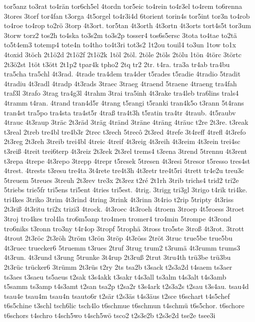{tor5anz
to3rat
to4rän
tor6ch5el
4tordn
tor5eic
to4rein
to4r3el
to4rem
to6renna
3tores
3torf
tor4fan
t3orga
4t5orgel
to4r3i4d
6torient
torin4s
tor5int
tor3n
to4rob
to4roe
to4rop
to2rö
3torp
4t3ort.
tor5tan
4t3orth
4t3ortn
4t3orts
tort4s5t
tor3um
3torw
torz2
tos2h
to4ska
to3s2m
to3s2p
tosser4
tos6s5ersc
3tota
to4tae
to2tä
to5t4em3
totemp4
tote4n
to4tho
to4t3ri
tot3s2
1t2ou
touil4
to3un
1tow
to1x
4toxid
3töch
2t1ö2d
2t1ö2f
2t1ö2k
1töl
2töl.
2töle
2töls
2tölu
1tön
4törc
3törtc
2t3ö2st
1töt
t3ött
2t1p2
tpar4k
tpho2
2tq
tr2
2tr.
t4ra.
tra3a
tr4ab
tra4bu
tra5cha
tra5chl
4t3rad.
4trade
tra4dem
tra4der
t5rades
t5radie
4tradio
5tradit
4tradiu
4t3radl
4tradp
4t3rads
3traec
3traeg
4traend
5traene
4traeng
tra4fah
traf3l
3trafo
3trag
tra4g3l
4trahm
3trai
tra5inh
4t3rake
tra4leb
tra6lins
trals4
4tramm
t4ran.
4trand
tran4d5r
4trang
t5rangi
t5ranki
tran4k5o
t3rann
5t4rans
tran4st
tra5po
tra4sta
tra4st5r
4traß
tra4t3h
t5ratin
tra4tr
4traub.
4t5raubv
4trauc
4t3raup
3träc
2t3räd
3träg
4tränd
3träne
4träng
4träuc
t2re
2t3re.
t3reak
t3real
2treb
tre4bl
tre4b3r
2trec
t3rech
5trecô
2t3red
4trefe
3t4reff
4trefl
4t3refo
2t3reg
2t3reh
3treib
trei4bl
4treic
4treif
4t3reig
4t3reih
4t3reim
4t3rein
trei4sc
t3reiß
4treit
trei6terp
4t3reiz
2t3rek
2t3rel
trems4
t3rena
3trend
5trennu
4t3rent
t3repa
4trepe
4t3repo
3trepp
4trepr
t5resek
5tresen
4t3resi
5tresor
t5resso
tres4st
4trest.
4trests
t3resu
tre4ta
3t4rete
tre4t3h
4t3retr
tre4t5ri
4trett
tr4e2u
treu3c
5treuem
5treues
3treuh
2t3rev
tre3x
2t3rez
t2ré
2t1rh
3trib
trichs4
trid2
tri2e
5triebs
trie5fr
tri5ens
tri5ent
4tries
tri5est.
4trig.
3trigg
tri3gl
3trigo
t4rik
tri4ke.
tri4kes
3triko
3trim
4t3rind
4tring
3trink
4t3rinn
3t4rio
t2rip
5tripty
4t3riss
2t3riß
4t3ritu
tri2x
trizi3
4trock.
4t3roec
4t3roeh
4troem
3troep
4t5roess
3troet
3troj
tro4kes
trol4la
tro6m5anp
tro4men
tromer4
tro4min
5trompe
4t3rond
tro6niks
t3ronn
tro3ny
t4r4op
3tropf
5trophä
3tross
tro5ste
3troß
4t3rot.
3trott
4trout
2t3röc
2t3röh
2tröm
t3rön
3tröp
4t3röss
2tröt
3truc
true5be
true5bu
4t3ruec
truecker6
5truemm
t3rues
2truf
3trug
trum2
t3rumä
4t3rumm
trums3
4t3run.
4t3rund
t3rung
5trunke
3t4rup
2t3ruß
2trut
3tru4th
trü3be
trü3bu
2t3rüc
trücker6
3trümm
2t3rüs
t2ry
2ts
tsa2b
t3sack
t2s3a2d
t4saem
ts3aer
ts3aes
t3saeu
ts5aeus
t2sak
t3s4akk
t3sakr
t4s3all
ts3alm
t4s3alt
t4s3amb
t5samm
ts3amp
t4s3amt
t2san
tsa2p
t2sa2r
t3s4ark
t2s3a2s
t2sau
t3s4au.
tsau4d
tsau4e
tsau4m
tsau4n
tsauto6r
t2sär
t2s3äs
t4s3äus
t2sce
t6schart
t4s5chef
t6s5chine
t3schl
tsch6lic
tsch4lo
t6schmue
t6schmun
t4schmü
t6s5chor.
t6schore
t6schors
t4schro
t4sch5wo
t4sch5wö
tsco2
t2s3e2b
t2s3e2d
tse2e
tsee3i
}
